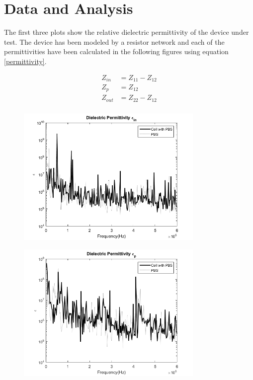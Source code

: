 \documentclass[journal]{IEEEtran}
\begin{document}
\section{Data and Analysis}
The first three plots show the relative dielectric permittivity of the device under test. The device has been modeled by a resistor network and each of the permittivities have been calculated in the following figures using equation \ref{permittivity}.

\begin{align*}
Z_{in} &= Z_{11} - Z_{12} \\
Z_{p} &= Z_{12} \\
Z_{out} &= Z_{22} - Z_{12} \\
\end{align*} 

\begin{figure}[ht]
\label{diectric_Permittivity_in}
\includegraphics[width = 9cm]{Epsilon_In.png}
\end{figure}

\begin{figure}[ht]
\label{diectric_Permittivity_P}
\includegraphics[width = 9cm]{Epsilon_P.png}
\end{figure}
\end{document}
